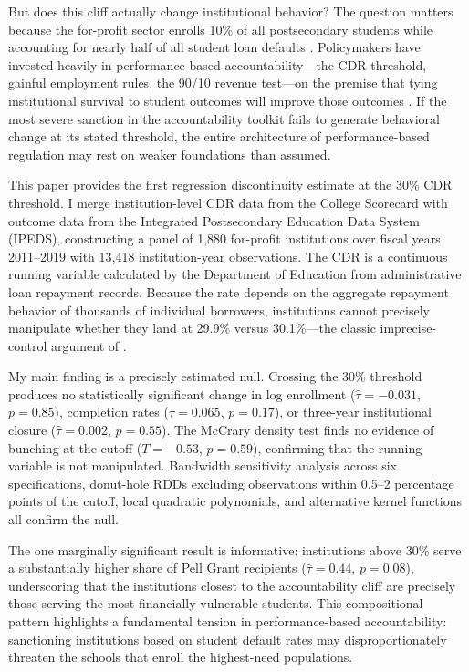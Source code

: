 \documentclass[12pt]{article}
\begin{document}
But does this cliff actually change institutional behavior? The question matters because the for-profit sector enrolls 10\% of all postsecondary students while accounting for nearly half of all student loan defaults \citep{looney2015}. Policymakers have invested heavily in performance-based accountability---the CDR threshold, gainful employment rules, the 90/10 revenue test---on the premise that tying institutional survival to student outcomes will improve those outcomes \citep{cellini2019}. If the most severe sanction in the accountability toolkit fails to generate behavioral change at its stated threshold, the entire architecture of performance-based regulation may rest on weaker foundations than assumed.

This paper provides the first regression discontinuity estimate at the 30\% CDR threshold. I merge institution-level CDR data from the College Scorecard with outcome data from the Integrated Postsecondary Education Data System (IPEDS), constructing a panel of 1,880 for-profit institutions over fiscal years 2011--2019 with 13,418 institution-year observations. The CDR is a continuous running variable calculated by the Department of Education from administrative loan repayment records. Because the rate depends on the aggregate repayment behavior of thousands of individual borrowers, institutions cannot precisely manipulate whether they land at 29.9\% versus 30.1\%---the classic imprecise-control argument of \citet{lee2008}.

My main finding is a precisely estimated null. Crossing the 30\% threshold produces no statistically significant change in log enrollment ($\hat{\tau}=-0.031$, $p=0.85$), completion rates ($\hat{\tau}=0.065$, $p=0.17$), or three-year institutional closure ($\hat{\tau}=0.002$, $p=0.55$). The McCrary density test finds no evidence of bunching at the cutoff ($T=-0.53$, $p=0.59$), confirming that the running variable is not manipulated. Bandwidth sensitivity analysis across six specifications, donut-hole RDDs excluding observations within 0.5--2 percentage points of the cutoff, local quadratic polynomials, and alternative kernel functions all confirm the null.

The one marginally significant result is informative: institutions above 30\% serve a substantially higher share of Pell Grant recipients ($\hat{\tau}=0.44$, $p=0.08$), underscoring that the institutions closest to the accountability cliff are precisely those serving the most financially vulnerable students. This compositional pattern highlights a fundamental tension in performance-based accountability: sanctioning institutions based on student default rates may disproportionately threaten the schools that enroll the highest-need populations.
\end{document}
